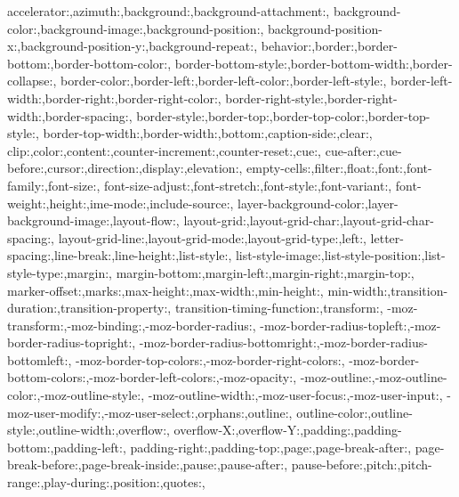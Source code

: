 {{            %
            accelerator:,azimuth:,background:,background-attachment:,
            background-color:,background-image:,background-position:,
            background-position-x:,background-position-y:,background-repeat:,
            behavior:,border:,border-bottom:,border-bottom-color:,
            border-bottom-style:,border-bottom-width:,border-collapse:,
            border-color:,border-left:,border-left-color:,border-left-style:,
            border-left-width:,border-right:,border-right-color:,
            border-right-style:,border-right-width:,border-spacing:,
            border-style:,border-top:,border-top-color:,border-top-style:,
            border-top-width:,border-width:,bottom:,caption-side:,clear:,
            clip:,color:,content:,counter-increment:,counter-reset:,cue:,
            cue-after:,cue-before:,cursor:,direction:,display:,elevation:,
            empty-cells:,filter:,float:,font:,font-family:,font-size:,
            font-size-adjust:,font-stretch:,font-style:,font-variant:,
            font-weight:,height:,ime-mode:,include-source:,
            layer-background-color:,layer-background-image:,layout-flow:,
            layout-grid:,layout-grid-char:,layout-grid-char-spacing:,
            layout-grid-line:,layout-grid-mode:,layout-grid-type:,left:,
            letter-spacing:,line-break:,line-height:,list-style:,
            list-style-image:,list-style-position:,list-style-type:,margin:,
            margin-bottom:,margin-left:,margin-right:,margin-top:,
            marker-offset:,marks:,max-height:,max-width:,min-height:,
            min-width:,transition-duration:,transition-property:,
            transition-timing-function:,transform:,
            -moz-transform:,-moz-binding:,-moz-border-radius:,
            -moz-border-radius-topleft:,-moz-border-radius-topright:,
            -moz-border-radius-bottomright:,-moz-border-radius-bottomleft:,
            -moz-border-top-colors:,-moz-border-right-colors:,
            -moz-border-bottom-colors:,-moz-border-left-colors:,-moz-opacity:,
            -moz-outline:,-moz-outline-color:,-moz-outline-style:,
            -moz-outline-width:,-moz-user-focus:,-moz-user-input:,
            -moz-user-modify:,-moz-user-select:,orphans:,outline:,
            outline-color:,outline-style:,outline-width:,overflow:,
            overflow-X:,overflow-Y:,padding:,padding-bottom:,padding-left:,
            padding-right:,padding-top:,page:,page-break-after:,
            page-break-before:,page-break-inside:,pause:,pause-after:,
            pause-before:,pitch:,pitch-range:,play-during:,position:,quotes:,
}}
